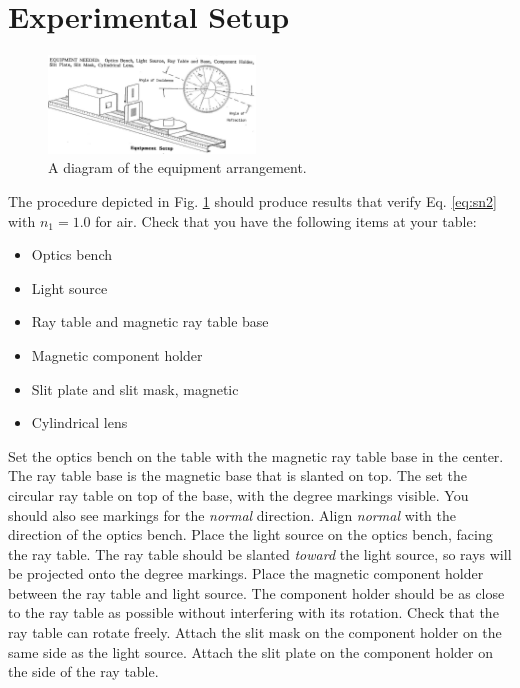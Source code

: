 \documentclass[12pt,twocolumn]{article}
\begin{document}
\section{Experimental Setup}

\begin{figure}[ht]
\centering
\includegraphics[width=0.49\textwidth]{equip.png}
\caption{\label{fig:equip} A diagram of the equipment arrangement.}
\end{figure}

\noindent
The procedure depicted in Fig. \ref{fig:equip} should produce results that verify Eq. \ref{eq:sn2} with $n_1 = 1.0$ for air.  Check that you have the following items at your table:

\begin{itemize}
\item Optics bench
\item Light source
\item Ray table and magnetic ray table base
\item Magnetic component holder
\item Slit plate and slit mask, magnetic
\item Cylindrical lens
\end{itemize}

Set the optics bench on the table with the magnetic ray table base in the center.  The ray table base is the magnetic base that is slanted on top.  The set the circular ray table on top of the base, with the degree markings visible.  You should also see markings for the \textit{normal} direction.  Align \textit{normal} with the direction of the optics bench.  Place the light source on the optics bench, facing the ray table.  The ray table should be slanted \textit{toward} the light source, so rays will be projected onto the degree markings.  Place the magnetic component holder between the ray table and light source.  The component holder should be as close to the ray table as possible without interfering with its rotation.  Check that the ray table can rotate freely.  Attach the slit mask on the component holder on the same side as the light source.  Attach the slit plate on the component holder on the side of the ray table.
\end{document}
